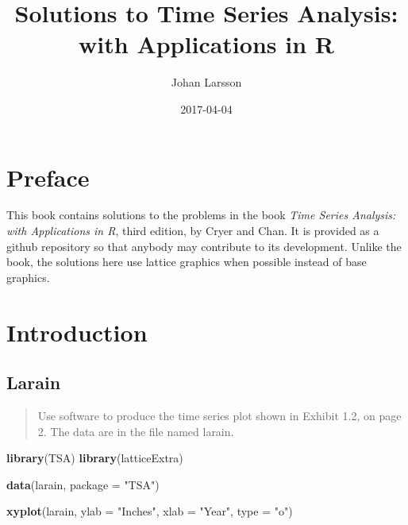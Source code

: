 \documentclass[]{book}
\title{Solutions to Time Series Analysis: with Applications in R}
\author{Johan Larsson}
\date{2017-04-04}
\newenvironment{Shaded}{\begin{snugshade}}{\end{snugshade}}
\newcommand{\KeywordTok}[1]{\textcolor[rgb]{0.13,0.29,0.53}{\textbf{{#1}}}}
\newcommand{\DataTypeTok}[1]{\textcolor[rgb]{0.13,0.29,0.53}{{#1}}}
\newcommand{\StringTok}[1]{\textcolor[rgb]{0.31,0.60,0.02}{{#1}}}
\newcommand{\NormalTok}[1]{{#1}}
\begin{document}
\maketitle

{
\setcounter{tocdepth}{1}
\tableofcontents
}
\chapter*{Preface}\label{preface}

This book contains solutions to the problems in the book \emph{Time
Series Analysis: with Applications in R}, third edition, by Cryer and
Chan. It is provided as a github repository so that anybody may
contribute to its development. Unlike the book, the solutions here use
lattice graphics when possible instead of base graphics.

\chapter{Introduction}\label{introduction}

\section{Larain}\label{larain}

\begin{quote}
Use software to produce the time series plot shown in Exhibit 1.2, on
page 2. The data are in the file named larain.
\end{quote}

\begin{Shaded}
\begin{Highlighting}[]
\KeywordTok{library}\NormalTok{(TSA)}
\KeywordTok{library}\NormalTok{(latticeExtra)}

\KeywordTok{data}\NormalTok{(larain, }\DataTypeTok{package =} \StringTok{"TSA"}\NormalTok{)}
\end{Highlighting}
\end{Shaded}

\begin{Shaded}
\begin{Highlighting}[]
\KeywordTok{xyplot}\NormalTok{(larain, }\DataTypeTok{ylab =} \StringTok{"Inches"}\NormalTok{, }\DataTypeTok{xlab =} \StringTok{"Year"}\NormalTok{, }\DataTypeTok{type =} \StringTok{"o"}\NormalTok{)}
\end{Highlighting}
\end{Shaded}
\end{document}
